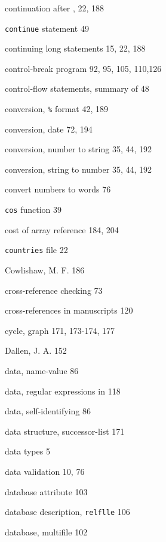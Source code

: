 \begin{multicols}{3}
\hangindent=4pc  continuation after , 22, 188

\hangindent=4pc  \verb'continue' statement 49

\hangindent=4pc  continuing long statements 15, 22, 188

\hangindent=4pc  control-break program 92, 95, 105, 110,126

\hangindent=4pc  control-flow statements, summary of 48

\hangindent=4pc  conversion, \verb'%' format 42, 189

\hangindent=4pc  conversion, date 72, 194

\hangindent=4pc  conversion, number to string 35, 44, 192

\hangindent=4pc  conversion, string to number 35, 44, 192

\hangindent=4pc  convert numbers to words 76

\hangindent=4pc  \verb'cos' function 39

\hangindent=4pc  cost of array reference 184, 204

\hangindent=4pc  \verb'countries' file 22

\hangindent=4pc  Cowlishaw, M. F. 186

\hangindent=4pc  cross-reference checking 73

\hangindent=4pc  cross-references in manuscripts 120

\hangindent=4pc  cycle, graph 171, 173-174, 177

\hangindent=4pc  Dallen, J. A. 152

\hangindent=4pc  data, name-value 86

\hangindent=4pc  data, regular expressions in 118

\hangindent=4pc  data, self-identifying 86

\hangindent=4pc  data structure, successor-list 171

\hangindent=4pc  data types 5

\hangindent=4pc  data validation 10, 76

\hangindent=4pc  database attribute 103

\hangindent=4pc  database description, \verb'relflle' 106

\hangindent=4pc  database, multifile 102


\end{multicols}
